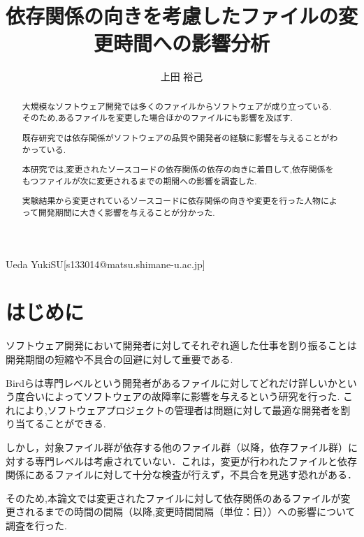 \documentclass[submit,ses,noauthor]{ipsj} %
\begin{document}
\title{依存関係の向きを考慮したファイルの変更時間への影響分析}

\etitle{}%



\author{上田 裕己}{Ueda Yuki}{SU}[s133014@matsu.shimane-u.ac.jp]

\begin{abstract}
大規模なソフトウェア開発では多くのファイルからソフトウェアが成り立っている.
そのため,あるファイルを変更した場合ほかのファイルにも影響を及ぼす.

既存研究では依存関係がソフトウェアの品質や開発者の経験に影響を与えることがわかっている.

本研究では,変更されたソースコードの依存関係の依存の向きに着目して,依存関係をもつファイルが次に変更されるまでの期間への影響を調査した.
 
実験結果から変更されているソースコードに依存関係の向きや変更を行った人物によって開発期間に大きく影響を与えることが分かった.
  

\end{abstract}

\maketitle

\section{はじめに} 
ソフトウェア開発において開発者に対してそれぞれ適した仕事を割り振ることは開発期間の短縮や不具合の回避に対して重要である.

Bird\cite{Bird}らは専門レベルという開発者があるファイルに対してどれだけ詳しいかという度合いによってソフトウェアの故障率に影響を与えるという研究を行った.
これにより,ソフトウェアプロジェクトの管理者は問題に対して最適な開発者を割り当てることができる.

しかし，対象ファイル群が依存する他のファイル群（以降，依存ファイル群）に対する専門レベルは考慮されていない．これは，変更が行われたファイルと依存関係にあるファイルに対して十分な検査が行えず，不具合を見逃す恐れがある．


そのため,本論文では変更されたファイルに対して依存関係のあるファイルが変更されるまでの時間の間隔（以降,変更時間間隔（単位：日））への影響について調査を行った.
\end{document}
